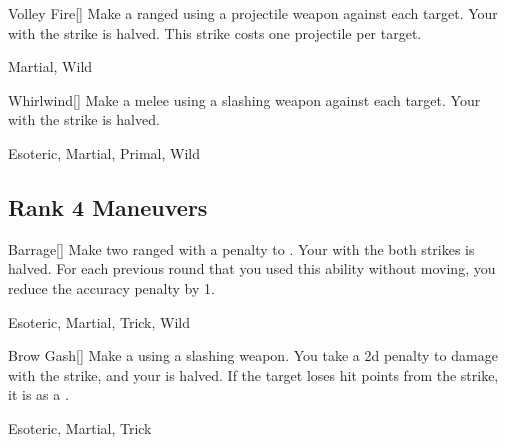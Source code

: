\lowercase{\hypertarget{maneuver:Volley Fire}{}}\label{maneuver:Volley Fire}
\hypertarget{maneuver:Volley Fire}{}
\begin{freeability}[Rank 3]{Volley Fire}[]
Make a ranged  using a projectile weapon against each target.
Your  with the strike is halved.
This strike costs one projectile per target.


 Martial, Wild
\end{freeability}
\vspace{0.25em}



\lowercase{\hypertarget{maneuver:Whirlwind}{}}\label{maneuver:Whirlwind}
\hypertarget{maneuver:Whirlwind}{}
\begin{freeability}[Rank 3]{Whirlwind}[]
Make a melee  using a slashing weapon against each target.
Your  with the strike is halved.


 Esoteric, Martial, Primal, Wild
\end{freeability}
\vspace{0.25em}


\subsection{Rank 4 Maneuvers}

\lowercase{\hypertarget{maneuver:Barrage}{}}\label{maneuver:Barrage}
\hypertarget{maneuver:Barrage}{}
\begin{freeability}[Rank 4]{Barrage}[]
Make two ranged  with a  penalty to .
Your  with the both strikes is halved.
For each previous round that you used this ability without moving, you reduce the accuracy penalty by 1.


 Esoteric, Martial, Trick, Wild
\end{freeability}
\vspace{0.25em}



\lowercase{\hypertarget{maneuver:Brow Gash}{}}\label{maneuver:Brow Gash}
\hypertarget{maneuver:Brow Gash}{}
\begin{freeability}[Rank 4]{Brow Gash}[]
Make a  using a slashing weapon.
You take a \minus2d penalty to damage with the strike, and your  is halved.
If the target loses hit points from the strike, it is  as a .


 Esoteric, Martial, Trick
\end{freeability}
\vspace{0.25em}



